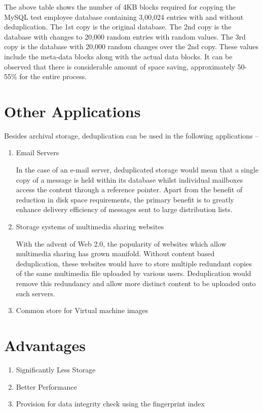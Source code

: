 \documentclass[final]{ols}
\begin{document}
The above table shows the number of 4KB blocks required for copying the MySQL test employee database containing 3,00,024 entries with and without deduplication. The 1st copy is the original database. The 2nd copy is the database with changes to 20,000 random entries with random values. The 3rd copy is the database with 20,000 random changes over the 2nd copy. These values include the meta-data blocks along with the actual data blocks. It can be observed that there is considerable amount of space saving, approximately 50-55\% for the entire process. 

\section{Other Applications}
Besides archival storage, deduplication can be used in the following applications --
\begin{enumerate}
\item Email Servers

  In the case of an e-mail server, deduplicated storage would mean that a single copy of a message is held within its database whilst individual mailboxes access the content through a reference pointer. Apart from the benefit of reduction in disk space requirements, the primary benefit is to greatly enhance delivery efficiency of messages sent to large distribution lists. 

\item Storage systems of multimedia sharing websites

  With the advent of Web 2.0, the popularity of websites which allow multimedia sharing has grown manifold. Without content based deduplication, these websites would have to store multiple redundant copies of the same multimedia file uploaded by various users. Deduplication would remove this redundancy and allow more distinct content to be uploaded onto such servers. 
\item Common store for Virtual machine images
\end{enumerate}

\section{Advantages}

\begin{enumerate}
\item Significantly Less Storage
\item Better Performance
\item Provision for data integrity check using the fingerprint index
\end{enumerate}
\end{document}
